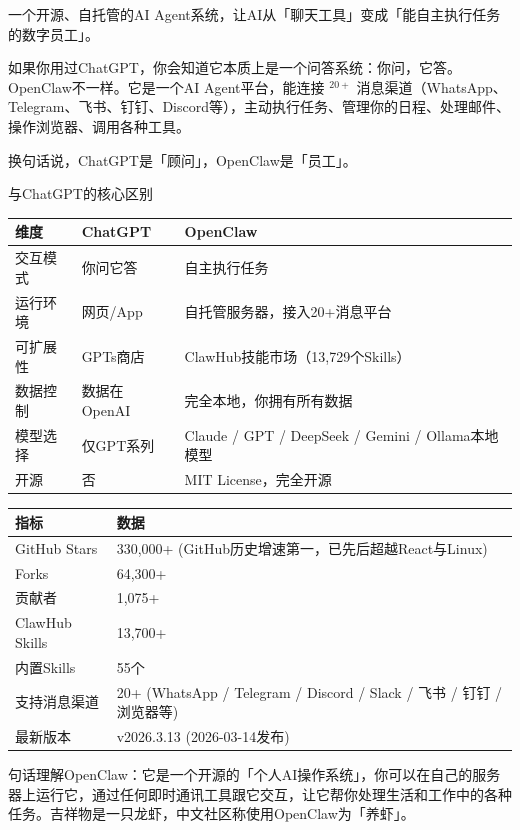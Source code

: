 \documentclass[
  10
]{article}
\newcounter{none} %
\begin{document}
一个开源、自托管的AI
Agent系统，让AI从「聊天工具」变成「能自主执行任务的数字员工」。

如果你用过ChatGPT，你会知道它本质上是一个问答系统：你问，它答。OpenClaw不一样。它是一个AI
Agent平台，能连接 \(^ { 2 0 + }\)
消息渠道（WhatsApp、Telegram、飞书、钉钉、Discord等），主动执行任务、管理你的日程、处理邮件、操作浏览器、调用各种工具。

换句话说，ChatGPT是「顾问」，OpenClaw是「员工」。

与ChatGPT的核心区别

{\def\LTcaptype{none} %
\begin{longtable}[]{@{}|l|l|l|@{}}
\toprule\noalign{}
\endhead
\bottomrule\noalign{}
\endlastfoot
\hline
维度 & ChatGPT & OpenClaw \\
\hline
交互模式 & 你问它答 & 自主执行任务 \\
\hline
运行环境 & 网页/App & 自托管服务器，接入20+消息平台 \\
\hline
可扩展性 & GPTs商店 & ClawHub技能市场（13,729个Skills） \\
\hline
数据控制 & 数据在OpenAI & 完全本地，你拥有所有数据 \\
\hline
模型选择 & 仅GPT系列 & Claude / GPT / DeepSeek / Gemini /
Ollama本地模型 \\
\hline
开源 & 否 & MIT License，完全开源 \\
\hline
\end{longtable}
}

{\def\LTcaptype{none} %
\begin{longtable}[]{@{}|l|l|@{}}
\toprule\noalign{}
\endhead
\bottomrule\noalign{}
\endlastfoot
\hline
指标 & 数据 \\
\hline
GitHub Stars & 330,000+ (GitHub历史增速第一，已先后超越React与Linux) \\
\hline
Forks & 64,300+ \\
\hline
贡献者 & 1,075+ \\
\hline
ClawHub Skills & 13,700+ \\
\hline
内置Skills & 55个 \\
\hline
支持消息渠道 & 20+ (WhatsApp / Telegram / Discord / Slack / 飞书 / 钉钉
/ 浏览器等) \\
\hline
最新版本 & v2026.3.13 (2026-03-14发布) \\
\hline
\end{longtable}
}

句话理解OpenClaw：它是一个开源的「个人AI操作系统」，你可以在自己的服务器上运行它，通过任何即时通讯工具跟它交互，让它帮你处理生活和工作中的各种任务。吉祥物是一只龙虾，中文社区称使用OpenClaw为「养虾」。
\end{document}
